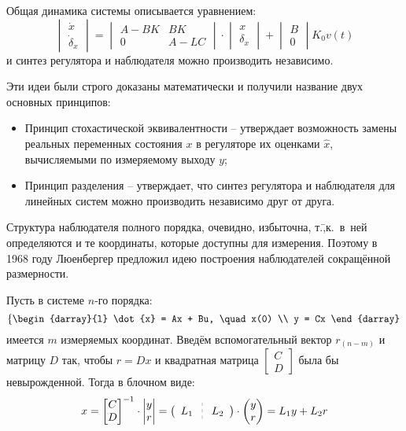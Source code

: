 \documentclass[preprint,russian,a5paper,10pt,twoside,mediummath]{ncc}
\newcommand{\columndelimiter}{ \enskip \raisebox{-1ex}{ \tikz \draw[very thin,dashed] (0,-2ex) -- (0,2ex); } \enskip }
\begin{document}
Общая динамика системы описывается уравнением:
\[ \begin{vmatrix}
	\dot{x} \\
	\dot{ \delta }_x
\end{vmatrix} = \begin{vmatrix}
	A - BK & BK \\
	0 & A - LC
\end{vmatrix} \cdot \begin{vmatrix}
	x \\
	\delta _x
\end{vmatrix} + \begin{vmatrix}
	B \\
	0
\end{vmatrix} K_0 v(t) \]
и синтез регулятора и наблюдателя можно производить независимо.

Эти идеи были строго доказаны математически и получили название двух основных принципов:
\begin{itemize}
\item Принцип стохастической эквивалентности \--- утверждает возможность замены реальных переменных состояния $ x $ в регуляторе их оценками $ \hat{x} $, вычисляемыми по измеряемому выходу $ y $;
\item Принцип разделения \--- утверждает, что синтез регулятора и наблюдателя для линейных систем можно производить независимо друг от друга.
\end{itemize}

Структура наблюдателя полного порядка, очевидно, избыточна, т.\=,к.~в~ней определяются и те координаты, которые доступны для измерения. Поэтому в 1968 году Люенбергер предложил идею построения наблюдателей сокращённой размерности.

\pagebreak
Пусть в системе $n$-го порядка:
\[ \left\{ \begin{darray}{l}
	\dot{x} = Ax + Bu, \quad x(0) \\
	y = Cx
\end{darray} \right. \]
имеется $m$ измеряемых координат. Введём вспомогательный вектор $ r_{(n-m)} $ и матрицу $ D $ так, чтобы $ r = Dx $ и квадратная матрица $ \begin{bmatrix} C \\ D \end{bmatrix} $ была бы невырожденной. Тогда в блочном виде:
\[ x = { \begin{bmatrix} C \\ D \end{bmatrix} }^{-1} \cdot \begin{vmatrix} y \\ r \end{vmatrix} = \bigl( \enskip L_1 \columndelimiter L_2 \enskip \bigr) \cdot \begin{pmatrix} y \\ r \end{pmatrix} = L_1 y + L_2 r \]
\end{document}
